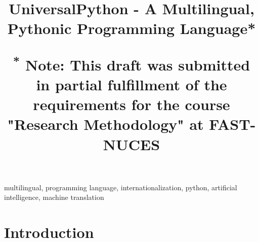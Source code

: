 \documentclass[conference]{IEEEtran}
\begin{document}
\title{UniversalPython - A Multilingual, Pythonic Programming Language*\\
{\footnotesize \textsuperscript{*}
Note: This draft was submitted in partial fulfillment of the requirements for the course "Research Methodology"
at FAST-NUCES

}
}

\author{
}

\maketitle

\begin{abstract}
\end{abstract}

\begin{IEEEkeywords}
multilingual, programming language, internationalization, python, artificial intelligence, machine translation
\end{IEEEkeywords}

\section{Introduction}

\end{document}
